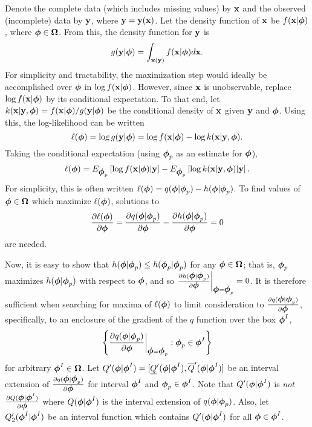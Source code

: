 \documentclass[10pt,twoside]{article}
\begin{document}
Denote the complete data (which includes missing values)
by $\bfx$ and the observed (incomplete) data
by $\bfy$, where $\bfy = \bfy(\bfx)$.  Let the density function
of $\bfx$ be $f(\bfx|\bfphi)$, where $\bfphi \in \bfOmega$.  
From this, the density function for $\bfy$ is 
$$
g(\bfy|\bfphi) = \int_{\bfx(\bfy)} f(\bfx|\bfphi)d\bfx.
$$
For simplicity and tractability, the maximization step would ideally be
accomplished over $\bfphi$ in $\log f(\bfx|\bfphi)$.  However, since $\bfx$
is
unobservable, replace $\log f (\bfx|\bfphi)$ by its conditional
expectation.  To
that end, let $k(\bfx|\bfy,\bfphi) = f(\bfx|\bfphi) / g(\bfy|\bfphi)$
be the conditional density of $\bfx$ given $\bfy$ and $\bfphi$.
Using this, the log-likelihood can be written
$$
\ell(\bfphi) = \log g(\bfy|\bfphi) = \log f(\bfx|\bfphi) - 
  \log k(\bfx|\bfy,\bfphi).
$$
Taking the conditional expectation (using $\bfphi_p$ as an 
estimate for $\bfphi$), 
$$
\ell(\bfphi) = E_{\bfphi_p} \left[\log f(\bfx|\bfphi) | \bfy \right] - 
  E_{\bfphi_p} \left[ \log k(\bfx|\bfy,\bfphi) | \bfy \right].
$$
For simplicity, this is often written 
$\ell(\bfphi) = q(\bfphi|\bfphi_p) - h(\bfphi|\bfphi_p)$.
To find values of $\bfphi \in \bfOmega$ which maximize 
$\ell(\bfphi)$, solutions to
$$ 
\frac{\partial \ell(\bfphi)}{\partial \bfphi} = 
\frac{\partial q(\bfphi | \bfphi_p)}{\partial \bfphi} - 
\frac{\partial h(\bfphi | \bfphi_p)}{\partial \bfphi} = 0
$$
are needed.

Now, it is easy to show that 
$h(\bfphi | \bfphi_p) \leq h(\bfphi_p | \bfphi_p)$ for 
any $\bfphi \in \bfOmega$; that is, $\bfphi_p$ maximizes $h(\bfphi | \bfphi_p)$
with
respect to $\bfphi$, and so 
$\frac{\partial h(\bfphi | \bfphi_p)}{\partial \bfphi}
  \bigg|_{\bfphi=\bfphi_p}=0$.  It is therefore sufficient when searching
for
maxima of $\ell(\bfphi)$ to limit consideration to 
$ \frac{\partial q(\bfphi | \bfphi_p)}{\partial \bfphi}$, specifically, to 
an enclosure of the gradient of the $q$ function over the box $\bfphi^I$,
$$
\left\{ \frac{\partial q(\bfphi | \bfphi_p)}{\partial\bfphi} 
  \bigg|_{\bfphi=\bfphi_p} : \bfphi_p \in \bfphi^I \right\}
$$
for arbitrary $\bfphi^I \in \bfOmega$.
Let $Q'(\bfphi | \bfphi^I) =
[\underline{Q}'(\bfphi | \bfphi^I), \overline{Q}'(\bfphi | \bfphi^I)]$
be an interval extension of
$\frac{\partial q(\bfphi|\bfphi_p)}{\partial\bfphi} $
for interval $\bfphi^I$ and $\bfphi_p \in \bfphi^I$.  Note that 
$Q'(\bfphi | \bfphi^I) $ is {\it not} 
$\frac{\partial Q(\bfphi | \bfphi^I )}{\partial \bfphi}$ where  
$Q(\bfphi | \bfphi^I)$ is the interval extension of $q(\bfphi | \bfphi_p)$.
Also, let $Q'_2(\bfphi^I | \bfphi^I)$ be an interval function which contains
$Q'(\bfphi | \bfphi^I)$ for all $\bfphi \in \bfphi^I$.
\end{document}
